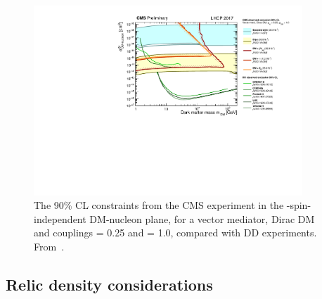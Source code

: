 \begin{figure}[!htpb]
\includegraphics[width=0.9\textwidth]{figures/SI_CMSDD_Summary}
\caption{The 90\% CL constraints from the CMS experiment in the \mdm-spin-independent DM-nucleon plane, for a vector mediator, Dirac DM and couplings \gq = 0.25 and \gdm = 1.0, compared with DD experiments. From~\cite{CMSSummary}.}
\label{fig:SICMS}
\end{figure}

\subsection{Relic density considerations}


